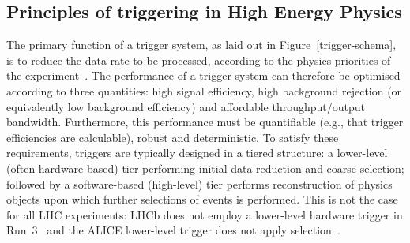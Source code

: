 \subsection{Principles of triggering in High Energy Physics}

The primary function of a trigger system, as laid out in Figure~\ref{trigger-schema}, is to reduce the data rate to be processed, according to the physics priorities of the  experiment~\cite{Jeitler_2017, Smith2020, Beck_2007, ellis2010trigger}. 
The performance of a trigger system can therefore be optimised according to three quantities: high signal efficiency, high background rejection (or equivalently low background efficiency) and affordable throughput/output bandwidth. 
Furthermore, this performance must be quantifiable (e.g., that trigger efficiencies are calculable), robust and deterministic. 
To satisfy these requirements, triggers are typically designed in a tiered structure: a lower-level (often hardware-based) tier performing initial data reduction and coarse selection; followed by a software-based (high-level) tier performs reconstruction of physics objects upon which further selections of events is performed. 
This is not the case for all LHC experiments: LHCb does not employ a lower-level hardware trigger in Run~3~\cite{LHCb_upgrade_trigger_TDR} and the ALICE lower-level trigger does not apply selection~\cite{alice-trigger-run3}.


